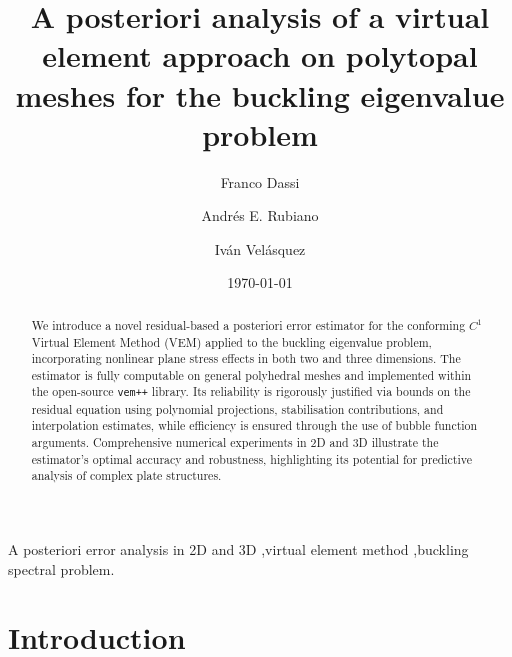 \documentclass[final,reqno]{elsarticle}
\date{\today}
\begin{document}
\begin{frontmatter}

\title{A posteriori analysis of a virtual element approach on polytopal meshes for the buckling eigenvalue problem}


\author[1]{Franco Dassi}
\address[1]{Dipartimento di Matematica e Applicazioni, Università degli studi di Milano Bicocca, Via Roberto Cozzi 55 - 20125 Milano, Italy.}
\author[2]{Andr\'es E. Rubiano}
\address[2]{School of Mathematics, Monash University, 9 Rainforest Walk, Melbourne, VIC 3800, Australia.}
\author[3]{Iv\'an Vel\'asquez}
\address[3]{Departamento de Matem\'aticas, Universidad Militar Nueva Granada, Bogot\'a, Colombia.}


\begin{abstract} 
We introduce a novel residual-based a posteriori error estimator for the conforming $C^1$ Virtual Element Method (VEM) applied to the buckling eigenvalue problem, incorporating nonlinear plane stress effects in both two and three dimensions. The estimator is fully computable on general polyhedral meshes and implemented within the open-source \texttt{vem++} library. Its reliability is rigorously justified via bounds on the residual equation using polynomial projections, stabilisation contributions, and interpolation estimates, while efficiency is ensured through the use of bubble function arguments. Comprehensive numerical experiments in 2D and 3D illustrate the estimator’s optimal accuracy and robustness, highlighting its potential for predictive analysis of complex plate structures.

\end{abstract}

\begin{keyword} 
A posteriori error analysis in 2D and 3D 
\sep virtual element method
\sep buckling spectral problem.
\end{keyword}


\end{frontmatter}
\setcounter{equation}{0}
\section{Introduction}\label{SEC:Introduction}
\end{document}
